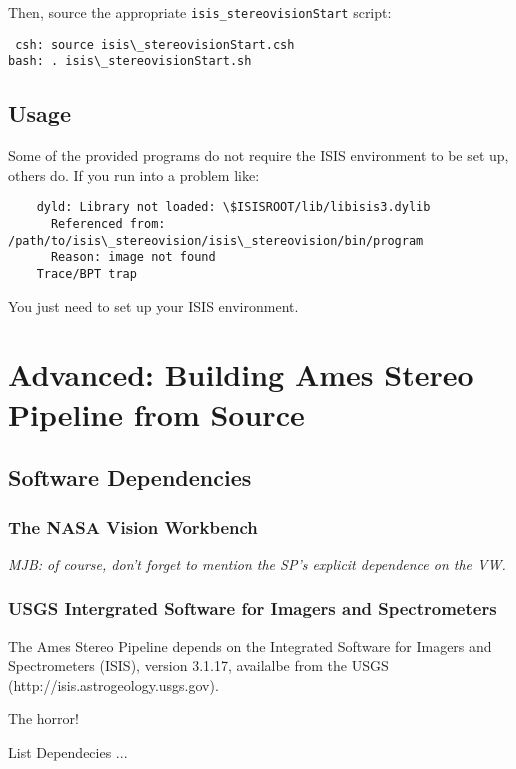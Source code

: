 Then, source the appropriate \texttt{isis\_stereovisionStart} script:
\begin{verbatim}
 csh: source isis\_stereovisionStart.csh
bash: . isis\_stereovisionStart.sh
\end{verbatim}

\subsection*{Usage}

Some of the provided programs do not require the ISIS environment
to be set up, others do.  If you run into a problem like:
\begin{verbatim}
    dyld: Library not loaded: \$ISISROOT/lib/libisis3.dylib
      Referenced from: /path/to/isis\_stereovision/isis\_stereovision/bin/program
      Reason: image not found
    Trace/BPT trap
\end{verbatim}

You just need to set up your ISIS environment.

\section{Advanced: Building Ames Stereo Pipeline from Source}

\subsection{Software Dependencies}

\subsubsection{The NASA Vision Workbench}

\emph{MJB: of course, don't forget to mention the SP's explicit dependence on the VW.}

\subsubsection{USGS Intergrated Software for Imagers and Spectrometers}

The Ames Stereo Pipeline depends on the Integrated Software for Imagers and Spectrometers (ISIS), version 3.1.17, availalbe from the USGS (http://isis.astrogeology.usgs.gov).  


The horror!

List Dependecies ...

